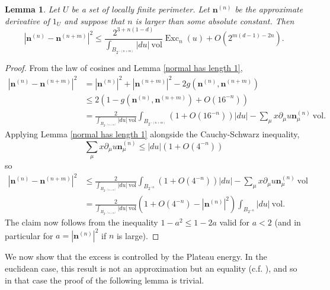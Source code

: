 \documentclass[reqno,12pt,letterpaper]{amsart}
\DeclareMathOperator{\Exc}{Exc}
\newcommand{\normal}{\mathbf n}
\newcommand{\vol}{\mathrm{vol}}
\newtheorem{lemma}[theorem]{Lemma}
\theoremstyle{definition}
\numberwithin{equation}{section}
\begin{document}
\begin{lemma} \label{excess bounds Cauchy sequence}
Let $U$ be a set of locally finite perimeter.
Let $\normal^{(n)}$ be the approximate derivative of $1_U$ and suppose that $n$ is larger than some absolute constant. Then
$$|\normal^{(n)} - \normal^{(n + m)}|^2 \leq \frac{2^{3 + n(1 - d)}}{\int_{B_{2^{-(n + m)}}} |du| ~\vol} \Exc_n(u) + O(2^{m(d - 1) - 2n}).$$
\end{lemma}
\begin{proof}
From the law of cosines and Lemma \ref{normal has length 1},
\begin{align*}
|\normal^{(n)} - \normal^{(n + m)}|^2 &= |\normal^{(n)}|^2 + |\normal^{(n + m)}|^2 - 2 g(\normal^{(n)}, \normal^{(n + m)})\\
&\leq 2(1 - g(\normal^{(n)}, \normal^{(n + m)}) + O(16^{-n})) \\
&= \frac{2}{\int_{B_{2^{-(n + m)}}} |du| ~\vol} \int_{B_{2^{-(n + m)}}} (1 + O(16^{-n}))|du| - \sum_\mu x \partial_\mu u \normal_\mu^{(n)} ~\vol.
\end{align*}
Applying Lemma \ref{normal has length 1} alongside the Cauchy-Schwarz inequality,
$$\sum_\mu x \partial_\mu u \normal_\mu^{(n)} \leq |du|(1 + O(4^{-n}))$$
so
\begin{align*}
|\normal^{(n)} - \normal^{(n + m)}|^2 &\leq \frac{2}{\int_{B_{2^{-(n + m)}}} |du| ~\vol} \int_{B_{2^{-n}}} (1 + O(4^{-n}))|du| - \sum_\mu x \partial_\mu u \normal_\mu^{(n)} ~\vol\\
&= \frac{2}{\int_{B_{2^{-(n + m)}}} |du| ~\vol} (1 + O(4^{-n}) - |\normal^{(n)}|^2) \int_{B_{2^{-n}}} |du| ~\vol.
\end{align*}
The claim now follows from the inequality $1 - a^2 \leq 1 - 2a$ valid for $a < 2$ (and in particular for $a = |\normal^{(n)}|^2$ if $n$ is large).
\end{proof}

We now show that the excess is controlled by the Plateau energy.
In the euclidean case, this result is not an approximation but an equality (c.f. \cite[pg83]{Giusti77}), and so in that case the proof of the following lemma is trivial.
\end{document}
